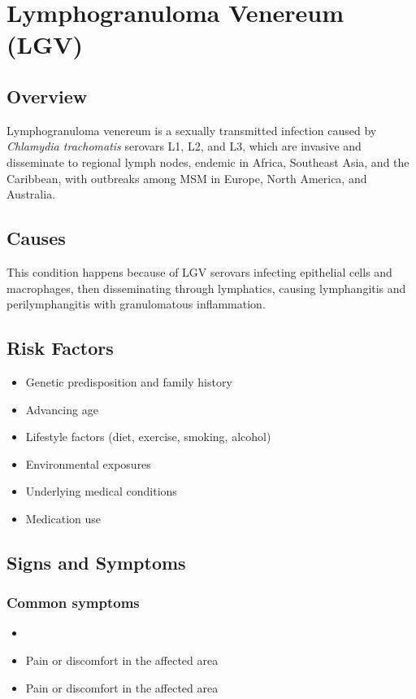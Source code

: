 \chapter{Lymphogranuloma Venereum (LGV)}
\label{sec:Lymphogranuloma Venereum}

\section{Overview}
Lymphogranuloma venereum is a sexually transmitted infection caused by \textit{Chlamydia trachomatis} serovars L1, L2, and L3, which are invasive and disseminate to regional lymph nodes, endemic in Africa, Southeast Asia, and the Caribbean, with outbreaks among MSM in Europe, North America, and Australia.
\section{Causes}
This condition happens because of LGV serovars infecting epithelial cells and macrophages, then disseminating through lymphatics, causing lymphangitis and perilymphangitis with granulomatous inflammation.     
\section{Risk Factors}

\begin{itemize}[noitemsep]
  \item Genetic predisposition and family history
  \item Advancing age
  \item Lifestyle factors (diet, exercise, smoking, alcohol)
  \item Environmental exposures
  \item Underlying medical conditions
  \item Medication use
\end{itemize}
\section{Signs and Symptoms}

\subsection{Common symptoms}
\begin{itemize}[noitemsep]
  \item \item Pain or discomfort in the affected area    \item Pain or discomfort in the affected area
  \end{itemize}

